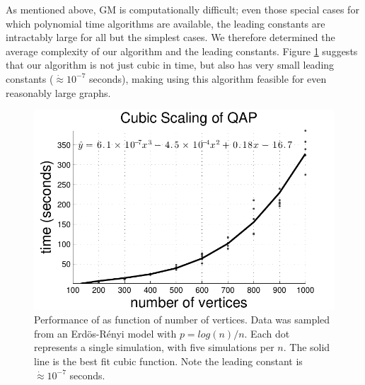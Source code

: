 \documentclass[10pt,journal,cspaper,compsoc]{IEEEtran}
\begin{document}
As mentioned above, GM is computationally difficult; even those special cases for which polynomial time algorithms are available, the leading constants are intractably large for all but the simplest cases. We therefore determined the average complexity of our algorithm and the leading constants.  Figure \ref{fig:scaling} suggests that our algorithm is not just cubic in time, but also has very small leading constants ($\dot{\approx} 10^{-7}$ seconds), making using this algorithm feasible for even reasonably large graphs.



\begin{figure}[htbp]
	\centering			
	\includegraphics[width=1.0\linewidth]{../figs/ErdosRenyi_results.pdf}
	\caption{Performance of \FAQ as function of number of vertices. Data was sampled from an Erd\"os-R\'enyi model with $p=log(n)/n$.  Each dot represents a single simulation, with five simulations per $n$.  The solid line is the best fit cubic function.  Note the leading constant is $\dot{\approx} 10^{-7}$ seconds. }
	\label{fig:scaling}
\end{figure}
\end{document}
